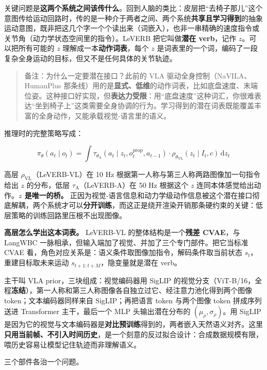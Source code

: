 \documentclass[
  chinese,
]{ctexart}
\begin{document}
关键问题是\textbf{这两个系统之间该传什么}。回到人脑的类比：皮层把``去椅子那儿''这个意图传给运动回路时，传的是一种介于两者之间、两个系统\textbf{共享且学习得到}的抽象运动意图，既非把这几个字一个个读出来（词嵌入），也非一串精确的速度指令或关节角（动力学状态空间里的指令）。LeVERB
把它叫做\textbf{潜在 verb}，记作 \(z\)。可以把所有可能的 \(z\)
理解成一本\textbf{动作词表}，每个 \(z\)
是词表里的一个词，编码了一段复杂全身运动的目标，但又不是任何具体的关节轨迹。

\begin{quote}
备注：为什么一定要潜在接口？此前的 VLA 驱动全身控制（NaVILA、HumanPlus
那条线）用的是\textbf{显式、低维}的动作词表，比如底盘速度、末端位姿。这种接口好实现，但\textbf{表达力受限}：用``底盘速度''这种词汇，你很难表达``坐到椅子上''这类需要全身协调的行为。学习得到的潜在词表既能覆盖丰富的全身动作，又能承载视觉-语言里的语义。
\end{quote}

推理时的完整策略写成：

\[\pi_{\theta}(a_t \mid o_t) = \int \tau_{\theta_\text{A}}(a_t \mid z_t, o^{\text{prop}}_t, a_{t-1}) \cdot \rho_{\theta_\text{VL}}(z_t \mid I_t, c)\, \mathrm{d}z_t\]

高层 \(\rho_\text{VL}\)（LeVERB-VL）在 10 Hz
根据第一人称与第三人称两路图像加一句指令给出 \(z\) 的分布，低层
\(\tau_\text{A}\)（LeVERB-A）在 50 Hz 根据这个 \(z\)
连同本体感觉给出动作。\textbf{\(z\) 是唯一的桥。}
正因为视觉-语言信息和动力学级动作信息被这个潜在接口彻底解耦，两个系统才可以\textbf{分开训练}，而这正是绕开渲染开销那条硬约束的关键：低层策略的训练回路里压根不出现图像。

\textbf{高层怎么学出这本词表。} LeVERB-VL 的整体结构是一个\textbf{残差
CVAE}，与 LangWBC
一脉相承，但输入端加了视觉、并加了三个专门部件。把它当标准 CVAE
看，角色对应关系是：语义条件取图像加指令，解码条件取当前状态
\(s_t\)，重建目标取未来运动 \(s_{t+1:t+M}\)，隐变量就是潜在 verb。

主干叫 VLA prior，三块组成：视觉编码器用 SigLIP
的视觉分支（ViT-B/16，全程\textbf{冻结}），第一人称和第三人称图像各自独立过它、经注意力池化得到两个图像
token；文本编码器同样来自 SigLIP；再把语言 token 与两个图像 token
拼成序列送进 Transformer 主干，最后一个 MLP 头输出潜在分布的
\((\mu_\rho, \sigma_\rho)\)。用 SigLIP
是因为它的视觉与文本编码器是\textbf{对比预训练}得到的，两者嵌入天然语义对齐。这里\textbf{只用当前帧、不引入时间历史}，是一个刻意的反过拟合设计：合成数据规模有限，喂历史容易让模型记住轨迹而非理解语义。

三个部件各治一个问题。
\end{document}
